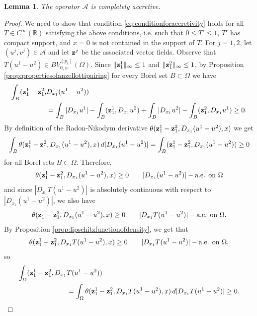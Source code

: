 \documentclass[reqno,12pt]{amsart}
\def\z{{\bf z}}
\newtheorem{lemma}[theorem]{Lemma}
\numberwithin{equation}{section}
\begin{document}
\begin{lemma}\label{lem:completeaccretivity}
The operator $\mathcal{A}$ is completely accretive.
\end{lemma}

\begin{proof}
We need to show that condition \eqref{eq:conditionforaccretivity} holds for all $T \in C^{\infty}(\mathbb{R})$ satisfying the above conditions, i.e. such that $0 \leq T' \leq 1$, $T'$ has compact support, and $x=0$ is not contained in the support of $T$. For $j = 1,2$, let $(u^j, v^j) \in \mathcal{A}$ and let $\z^j$ be the associated vector fields. Observe that $T(u^1 - u^2) \in BV_{0,w}^{(p_i)}(\Omega)$. Since $\| \z^1_1 \|_\infty \leq 1$ and $\| \z^2_1 \|_\infty \leq 1$, by Proposition \ref{prop:propertiesofanzellottipairing} for every Borel set $B \subset \Omega$ we have
\begin{align}
\int_{B} (\z^1_1 - \z^2_1, &D_{x_1}(u^1 - u^2)) \\
&=  \int_{B} \vert D_{x_1} u^1 \vert - \int_{B} (\z^1_1, D_{x_1} u^2) +  \int_{B} \vert D_{x_1} u^2 \vert - \int_{B} (\z^2_1, D_{x_1} u^1) \geq 0.
\end{align}
By definition of the Radon-Nikodym derivative $\theta(\z^1_1 - \z^2_1, D_{x_1} (u^1 - u^2), x)$ we get
$$ \int_{B} \theta(\z^1_1 - \z^2_1, D_{x_1} (u^1 - u^2), x) \, d \vert D_{x_1}(u^1 - u^2) \vert = \int_{B} (\z^1_1 - \z^2_1, D_{x_1} (u^1 - u^2)) \geq 0$$
for all Borel sets $B \subset \Omega$. Therefore,
$$\theta(\z^1_1 - \z^2_1, D_{x_1} (u^1 - u^2), x) \geq 0 \qquad \vert D_{x_1}(u^1 - u^2) \vert-\hbox{a.e. on } \Omega$$
and since $|D_{x_1} T(u^1 - u^2)|$ is absolutely continuous with respect to $|D_{x_1}(u^1 - u^2)|$, we also have
\begin{equation}\label{eq:estimateontheta}
\theta(\z^1_1 - \z^2_1, D_{x_1}(u^1 - u^2), x) \geq 0 \qquad \vert D_{x_1} T(u^1 - u^2) \vert-\hbox{a.e. on } \Omega.
\end{equation}
By Proposition \ref{prop:lipschitzfunctionofdensity}, we get that
\begin{equation}
\theta(\z^1_1 - \z^2_1, D_{x_1} T(u^1 - u^2), x) \geq 0 \qquad \vert D_{x_1} T(u^1 - u^2) \vert-\hbox{a.e. on } \Omega,
\end{equation}
so
\begin{align}\label{eq:completeaccretivityfirstestimate}
\int_{\Omega} (\z^1_1 - \z^2_1, D_{x_1} &T(u^1 - u^2)) \\
&=  \int_{\Omega} \theta(\z^1_1 - \z^2_1, D_{x_1} T(u^1 - u^2), x) \, d \vert D_{x_1} T(u^1 - u^2) \vert \geq 0.
\end{align}



\end{proof}
\end{document}
